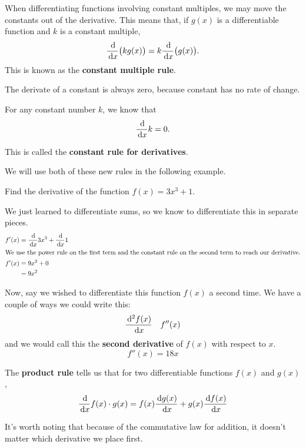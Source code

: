 When differentiating functions involving constant multiples, we may move the constants out of the derivative.
This means that, if $g(x)$ is a differentiable function and $k$ is a constant multiple,
\[ \frac{\,\mathrm{d}}{\,\mathrm{d} x} \big( k g(x) \big) = k \frac{\,\mathrm{d}}{\,\mathrm{d} x} \big(g(x)\big).\]
This is known as the \textbf{constant multiple rule}.

The derivate of a constant is always zero, because constant has no rate of change.
\begin{theorem}
  For any constant number $k$, we know that
  \[\frac{\,\mathrm{d}}{\,\mathrm{d} x} k=0.\]
  \label{th:deriv:constantrule}
\end{theorem}
This is called the \textbf{constant rule for derivatives}.

We will use both of these new rules in the following example.
\begin{ex}
  Find the derivative of the function $f(x)=3x^3+1$.
  \begin{sol}
    We just learned to differentiate sums, so we know to differentiate this in separate pieces.
    \begin{align*}
      f'(x) &= \frac{\,\mathrm{d}}{\,\mathrm{d} x} 3x^3 + \frac{\,\mathrm{d}}{\,\mathrm{d} x} 1 \\
      \intertext{We use the power rule on the first term and the constant rule on the second term to reach our derivative.}
      f'(x)&= 9x^2+0 \\
      &=9x^2
    \end{align*}
  \end{sol}
  Now, say we wished to differentiate this function $f(x)$ a second time.
  We have a couple of ways we could write this:
  \begin{align*}
    \frac{\,\mathrm{d}^2 f(x)}{\,\mathrm{d} x} && f''(x)
  \end{align*}
  and we would call this the \textbf{second derivative} of $f(x)$ with respect to $x$.
  \[ f''(x) = 18x \]
\end{ex}

\begin{theorem}
  The \textbf{product rule} tells us that for two differentiable functions $f(x)$ and $g(x)$,
  \begin{equation}
    \frac{\,\mathrm{d}}{\,\mathrm{d} x} f(x) \cdot g(x) = f(x) \frac{\,\mathrm{d} g(x)}{\,\mathrm{d} x}+g(x)\frac{\,\mathrm{d} f(x)}{\,\mathrm{d} x}
  \end{equation}
\end{theorem}
  It's worth noting that because of the commutative law for addition, it doesn't matter which derivative we place first.

